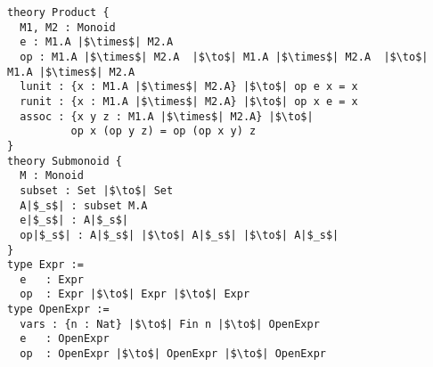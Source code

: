 \begin{verbatim}
theory Product { 
  M1, M2 : Monoid 
  e : M1.A |$\times$| M2.A
  op : M1.A |$\times$| M2.A  |$\to$| M1.A |$\times$| M2.A  |$\to$| M1.A |$\times$| M2.A
  lunit : {x : M1.A |$\times$| M2.A} |$\to$| op e x = x 
  runit : {x : M1.A |$\times$| M2.A} |$\to$| op x e = x 
  assoc : {x y z : M1.A |$\times$| M2.A} |$\to$| 
          op x (op y z) = op (op x y) z
}
theory Submonoid {
  M : Monoid
  subset : Set |$\to$| Set  
  A|$_s$| : subset M.A
  e|$_s$| : A|$_s$|
  op|$_s$| : A|$_s$| |$\to$| A|$_s$| |$\to$| A|$_s$| 
}
type Expr := 
  e   : Expr 
  op  : Expr |$\to$| Expr |$\to$| Expr
type OpenExpr := 
  vars : {n : Nat} |$\to$| Fin n |$\to$| OpenExpr
  e   : OpenExpr 
  op  : OpenExpr |$\to$| OpenExpr |$\to$| OpenExpr
\end{verbatim} 